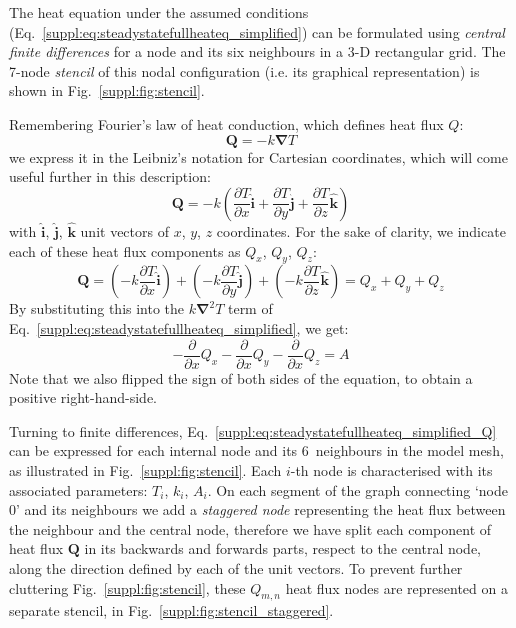 The heat equation under the assumed conditions (Eq.~\ref{suppl:eq:steadystatefullheateq_simplified}) can be formulated using \textit{central finite differences} for a node and its six neighbours in a 3-D rectangular grid.
The 7-node \textit{stencil} of this nodal configuration (i.e. its graphical representation) is shown in Fig.~\ref{suppl:fig:stencil}.

Remembering Fourier's law of heat conduction, which defines heat flux $Q$:
\begin{equation}
    \label{suppl:eq:HeatFlux}
    \bm{Q} = -k \bm{\nabla} T
\end{equation}
we express it in the Leibniz's notation for Cartesian coordinates, which will come useful further in this description:
\begin{equation}
    \label{suppl:eq:HeatFlux_3D}
    \bm{Q} =
        -k \left( 
            \frac{\partial T}{\partial x} \bm{\hat{i}} +
            \frac{\partial T}{\partial y} \bm{\hat{j}} +
            \frac{\partial T}{\partial z} \bm{\hat{k}}
        \right)
\end{equation}
with $\bm{\hat{i}}$, $\bm{\hat{j}}$, $\bm{\hat{k}}$ unit vectors of $x$, $y$, $z$ coordinates.
For the sake of clarity, we indicate each of these heat flux components as $Q_x$, $Q_y$, $Q_z$:
\begin{equation}
    \label{suppl:eq:HeatFlux_3D_component}
    \bm{Q} = 
    \left(-k \frac{\partial T}{\partial x} \bm{\hat{i}} \right) +
    \left(-k \frac{\partial T}{\partial y} \bm{\hat{j}} \right) +
    \left(-k \frac{\partial T}{\partial z} \bm{\hat{k}} \right) = Q_x + Q_y + Q_z
\end{equation}
By substituting this into the $k \bm{\nabla}^2 T$ term of Eq.~\ref{suppl:eq:steadystatefullheateq_simplified}, we get:
\begin{equation}
    \label{suppl:eq:steadystatefullheateq_simplified_Q}
    - \frac{\partial}{\partial x} Q_x -
    \frac{\partial}{\partial x} Q_y -
    \frac{\partial}{\partial x} Q_z = A
\end{equation}
Note that we also flipped the sign of both sides of the equation, to obtain a positive right-hand-side.

Turning to finite differences, Eq.~\ref{suppl:eq:steadystatefullheateq_simplified_Q} can be expressed for each internal node and its 6~neighbours in the model mesh, as illustrated in Fig.~\ref{suppl:fig:stencil}.
Each $i$-th node is characterised with its associated parameters: $T_i$, $k_i$, $A_i$.
On each segment of the graph connecting `node $0$' and its neighbours we add a \textit{staggered node} representing the heat flux between the neighbour and the central node, therefore we have split each component of heat flux $\bm{Q}$ in its backwards and forwards parts, respect to the central node, along the direction defined by each of the unit vectors.
To prevent further cluttering Fig.~\ref{suppl:fig:stencil}, these $Q_{m,n}$ heat flux nodes are represented on a separate stencil, in Fig.~\ref{suppl:fig:stencil_staggered}.

